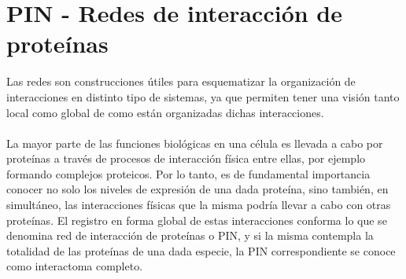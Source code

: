 \section{PIN - Redes de interacción de proteínas}
\label{sec:redes}
Las redes son construcciones útiles para esquematizar la organización de interacciones en distinto tipo de sistemas, ya que permiten tener una visión tanto local como global de como están organizadas dichas interacciones.\\\\
La mayor parte de las funciones biológicas en una célula es llevada a cabo por proteínas a través de procesos de interacción física entre ellas, por ejemplo formando complejos proteicos. Por lo tanto, es de fundamental importancia conocer no solo los niveles de expresión de una dada proteína, sino también, en simultáneo, las interacciones físicas que la misma podría llevar a cabo con otras proteínas. El registro en forma global de estas interacciones conforma lo que se denomina red de interacción de proteínas o PIN, y si la misma contempla la totalidad de las proteínas de una dada especie, la PIN correspondiente se conoce como interactoma completo.\\\\
